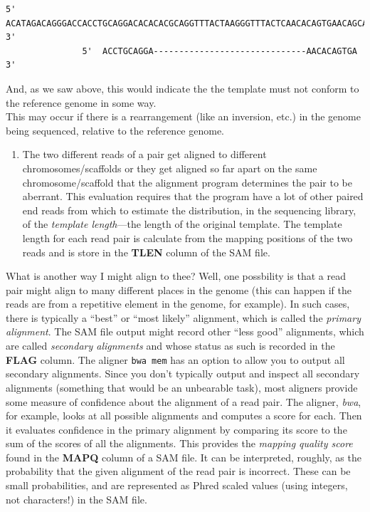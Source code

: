 \documentclass[]{krantz}
\providecommand{\tightlist}{%
  \setlength{\itemsep}{0pt}\setlength{\parskip}{0pt}}
\begin{document}
\begin{verbatim}
5'  ACATAGACAGGGACCACCTGCAGGACACACACGCAGGTTTACTAAGGGTTTACTCAACACAGTGAACAGCATATACCAGA  3'
               5'  ACCTGCAGGA------------------------------AACACAGTGA  3'
\end{verbatim}

And, as we saw above, this would indicate the the template must not
conform to the reference genome in some way.\\
This may occur if there is a rearrangement (like an inversion, etc.) in the
genome being sequenced, relative to the reference genome.

\begin{enumerate}
\def\labelenumi{(\arabic{enumi})}
\setcounter{enumi}{2}
\tightlist
\item
  The two different reads of a pair get aligned to different chromosomes/scaffolds or
  they get aligned so far apart on the same chromosome/scaffold that the alignment program
  determines the pair to be aberrant. This evaluation requires that the program have
  a lot of other paired end reads from which to estimate the distribution, in the sequencing library,
  of the \emph{template length}---the length of the original template. The template length
  for each read pair is calculate from the mapping positions of the two reads and
  is store in the \textbf{TLEN} column of the SAM file.
\end{enumerate}

What is another way I might align to thee? Well, one possbility is that a read pair
might align to many different places in the genome (this can happen if the reads are from
a repetitive element in the genome, for example). In such cases, there is typically
a ``best'' or ``most likely'' alignment, which is called the \emph{primary alignment}. The SAM
file output might record other ``less good'' alignments, which are called \emph{secondary alignments}
and whose status as such is recorded in the \textbf{FLAG} column. The aligner \texttt{bwa\ mem} has an
option to allow you to output all secondary alignments. Since you don't typically output and inspect
all secondary alignments (something that would be an unbearable task), most aligners
provide some measure of confidence about the alignment of a read pair. The aligner, \emph{bwa}, for example,
looks at all possible alignments and computes a score for each. Then it evaluates confidence
in the primary alignment by comparing its score to the sum of the scores of all the alignments.
This provides the \emph{mapping quality score} found in the
\textbf{MAPQ} column of a SAM file. It can be interpreted, roughly, as the probability that
the given alignment of the read pair is incorrect. These can be small probabilities,
and are represented as Phred scaled values (using integers, not characters!) in the
SAM file.
\end{document}

